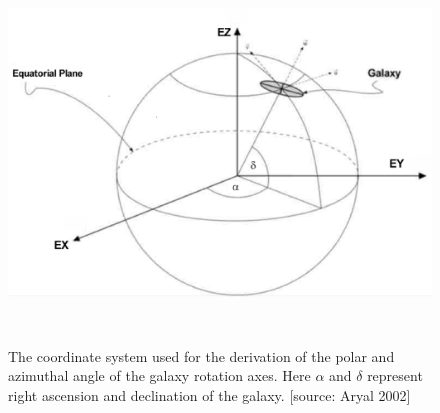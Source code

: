 \begin{figure} \vspace{0.0cm}
      \centering
      \includegraphics[height=10cm]{Godlowski1}
      \caption[]{The coordinate system used for the derivation of the polar and
azimuthal angle of the galaxy rotation axes. Here $\alpha$ and
$\delta$ represent right ascension and declination of the galaxy.
[source: Aryal 2002] }
\end{figure}
